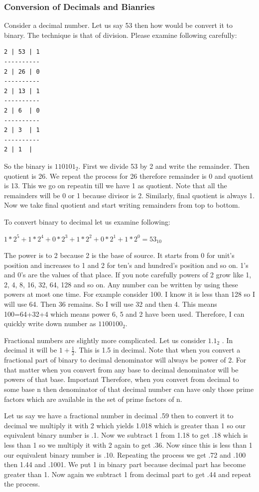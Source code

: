 \subsubsection{Conversion of Decimals and Bianries}
Consider a decimal number. Let us say 53 then how would be convert it to
binary. The technique is that of division. Please examine following carefully:

\hspace*{2cm}
\begin{Verbatim}[frame=single]
2 | 53 | 1
----------
2 | 26 | 0
----------
2 | 13 | 1
----------
2 | 6  | 0
----------
2 | 3  | 1
----------
2 | 1  |
\end{Verbatim}

So the binary is $110101_2$. First we divide 53 by 2 and write the
remainder. Then quotient is 26. We repeat the process for 26 therefore
remainder is 0 and quotient is 13. This we go on repeatin till we have 1 as
quotient. Note that all the remainders will be 0 or 1 because divisor is
2. Similarly, final quotient is always 1. Now we take final quotient and start
writing remainders from top to bottom.

To convert binary to decimal let us examine following:

$1*2^5 +1*2^4 +0*2^3 +1*2^2 +0*2^1 +1*2^0 =53_{10}$

The power is to 2 because 2 is the base of source. It starts from 0 for unit's
position and increases to 1 and 2 for ten's and hundred's position and so
on. 1's and 0's are the values of that place. If you note carefully powers of 2
grow like 1, 2, 4, 8, 16, 32, 64, 128 and so on. Any number can be written by
using these powers at most one time. For example consider 100. I know it is
less than 128 so I will use 64. Then 36 remains. So I will use 32 and then
4. This means 100=64+32+4  which means power 6, 5 and 2 have been
used. Therefore, I can quickly write down number as $1100100_2$.

Fractional numbers are slightly more complicated. Let us consider $1.1_2$  . In
decimal it will be $1+\frac{1}{2}$. This is 1.5 in decimal. Note that when you
convert a fractional part of binary to decimal denominator will always be power
of 2. For that matter when you convert from any base to decimal denominator
will be powers of that base. Important Therefore, when you convert from decimal
to some base n then denominator of that decimal number can have only those
prime factors which are available in the set of prime factors of n. 

Let us say we have a fractional number in decimal .59 then to convert it to
decimal we multiply it with 2 which yields 1.018 which is greater than 1 so our
equivalent binary number is .1. Now we subtract 1 from 1.18 to get .18 which
is less than 1 so we multiply it with 2 again to get .36. Now since this is
less than 1 our equivalent binary number is .10. Repeating the process we get
.72 and .100 then 1.44 and .1001. We put 1 in binary part because decimal part
has become greater than 1. Now again we subtract 1 from decimal part to get .44
and repeat the process.


